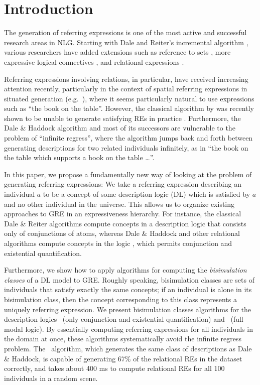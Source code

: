 \section{Introduction} \label{sec:introduction}

The generation of referring expressions is one of the most active and
successful research areas in NLG.  Starting with Dale and Reiter's
incremental algorithm \cite{Dale1995}, various researchers have added
extensions such as reference to sets \cite{Stone2000}, more expressive
logical connectives \cite{deemter01:_gener_refer_expres}, and
relational expressions \cite{dale91:_gener_refer_expres_invol_relat}.

Referring expressions involving relations, in particular, have
received increasing attention recently, particularly in the context of
spatial referring expressions in situated generation (e.g.\
\cite{kelleher06:_increm_gener_of_spatial_refer}), where it seems
particularly natural to use expressions such as ``the book on the
table''.  However, the classical algorithm by
 was recently shown to
be unable to generate satisfying REs in practice
\cite{viethen06:_algor_for_gener_refer_expres}.  Furthermore, the Dale
\& Haddock algorithm and most of its successors
\cite{Krahmer2003,kelleher06:_increm_gener_of_spatial_refer} are
vulnerable to the problem of ``infinite regress'', where the algorithm
jumps back and forth between generating descriptions for two related
individuals infinitely, as in ``the book on the table which supports a
book on the table \ldots''.

In this paper, we propose a fundamentally new way of looking at the
problem of generating referring expressions: We take a referring
expression describing an individual $a$ to be a concept of some
description logic (DL) which is satisfied by $a$ and no other
individual in the universe.  This allows us to organize existing
approaches to GRE in an expressiveness hierarchy.  For instance, the
classical Dale \& Reiter algorithms compute concepts in a description
logic that consists only of conjunctions of atoms, whereas Dale \&
Haddock and other relational algorithms compute concepts in the logic
\el, which permits conjunction and existential quantification.

Furthermore, we show how to apply algorithms for computing the
\emph{bisimulation classes} of a DL model to GRE.  Roughly speaking,
bisimulation classes are sets of individuals that satisfy exactly the
same concepts; if an individual is alone in its bisimulation class,
then the concept corresponding to this class represents a uniquely
referring expression.  We present bisimulation classes algorithms for
the description logics \el\ (only conjunction and existential
quantification) and \alc\ (full modal logic).  By essentially
computing referring expressions for all individuals in the domain at
once, these algorithms systematically avoid the infinite regress
problem.  The \el\ algorithm, which generates the same class of
descriptions as Dale \& Haddock, is capable of generating 67\% of the
relational REs in the
 dataset correctly,
and takes about 400 ms to compute relational REs for all 100
individuals in a random scene.

